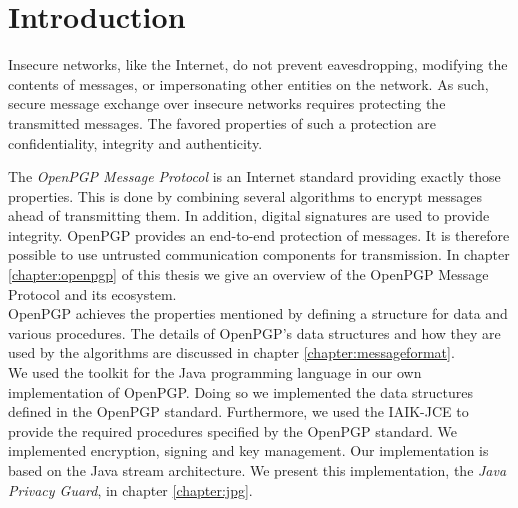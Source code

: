 \chapter{Introduction}



Insecure networks, like the Internet, do not prevent eavesdropping, modifying the contents of messages, or impersonating other entities on the network.
As such, secure message exchange over insecure networks requires protecting the transmitted messages. The favored properties of such a protection are confidentiality, integrity and authenticity.

The \textit{OpenPGP Message Protocol} is an Internet standard providing exactly those properties.  This is done by combining several algorithms to encrypt messages ahead of transmitting them. In addition, digital signatures are used to provide integrity. OpenPGP provides an end-to-end protection of messages. It is therefore possible to use untrusted communication components for transmission.
In chapter \ref{chapter:openpgp} of this thesis we give an overview of the OpenPGP Message Protocol and its ecosystem. \\

OpenPGP achieves the properties mentioned by defining a structure for data and various procedures. The details of OpenPGP's data structures and how they are used by the algorithms are discussed in chapter \ref{chapter:messageformat}. \\


We used the  toolkit for the Java programming language in our own implementation of OpenPGP. Doing so we implemented the data structures defined in the OpenPGP standard. Furthermore, we used the IAIK-JCE to provide the required procedures specified by the OpenPGP standard. We implemented encryption, signing and key management. Our implementation is based on the Java stream architecture. We present this implementation, the \textit{Java Privacy Guard}, in chapter \ref{chapter:jpg}. \\

